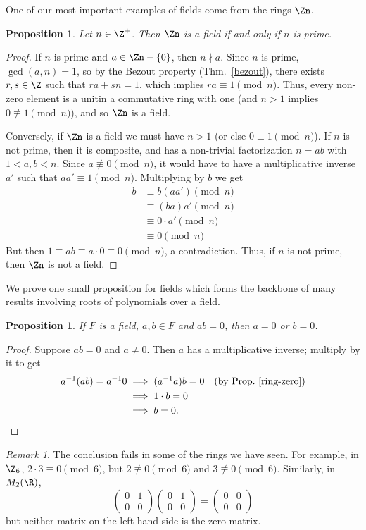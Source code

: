 \documentclass[12pt]{amsart}
\theoremstyle{plain}
\newtheorem{prop}[thm]{Proposition}
\theoremstyle{definition}
\theoremstyle{remark}
\newtheorem*{remark}{Remark}
\begin{document}
One of our most important examples of fields come from the rings $\Zn$.
\begin{prop} \label{zn-field}
  Let $n\in\Z^+$.  Then $\Zn$ is a field if and only if $n$ is prime.
\end{prop}
\begin{proof}
  If $n$ is prime and $a\in \Zn-\{0\}$, then $n\nmid a$.  Since $n$ is
  prime, $\gcd(a,n)=1$, so by the Bezout property (Thm.~\ref{bezout}),
  there exists $r,s\in\Z$ such that $ra+sn=1$, which implies $ra\equiv
  1\pmod n$.  Thus, every non-zero element is a unitin a commutative
  ring with one (and $n>1$ implies $0\not\equiv 1\pmod n$), and so
  $\Zn$ is a field.

  Conversely, if $\Zn$ is a field we must have $n>1$ (or else $0\equiv
  1\pmod n$).  If $n$ is not prime, then it is composite, and has a
  non-trivial factorization $n=ab$ with $1<a,b<n$.  Since $a\not\equiv
  0\pmod n$, it would have to have a multiplicative inverse $a'$ such
  that $aa'\equiv 1\pmod n$.  Multiplying by $b$ we get
  \begin{align*}
    b &\equiv b(aa') \pmod n \\
    &\equiv (ba)a' \pmod n \\
    &\equiv 0\cdot a' \pmod n \\
    &\equiv 0 \pmod n
  \end{align*}
  But then $1\equiv ab \equiv a\cdot 0 \equiv 0\pmod n$, a
  contradiction.  Thus, if $n$ is not prime, then $\Zn$ is not a field.
\end{proof}
We prove one small proposition for fields which forms the backbone of
many results involving roots of polynomials over a field.
\begin{prop}
  If $F$ is a field, $a,b\in F$ and $ab=0$, then $a=0$ or $b=0$.
\end{prop}
\begin{proof}
  Suppose $ab=0$ and $a\neq 0$.  Then $a$ has a multiplicative
  inverse; multiply by it to get
\begin{align*}
  a^{-1}(ab) = a^{-1}0 &\implies (a^{-1}a)b = 0 &\text{(by
    Prop.~\ref{ring-zero})} \\
  &\implies 1\cdot b = 0 \\
  &\implies b=0.
\end{align*}
\end{proof}
\begin{remark}
  The conclusion fails in some of the rings we have seen.  For
  example, in $\Z_6$, $2\cdot 3 \equiv 0\pmod 6$, but $2\not\equiv
  0\pmod 6$ and $3\not\equiv 0\pmod 6$.  Similarly, in $M_2(\R)$,\
  \[ \begin{pmatrix} 0 & 1\\0 &0\end{pmatrix}\begin{pmatrix} 0 & 1\\0
    & 0\end{pmatrix} = \begin{pmatrix} 0 & 0\\0 &0\end{pmatrix}\]
  but neither matrix on the left-hand side is the zero-matrix.
\end{remark}
\end{document}

